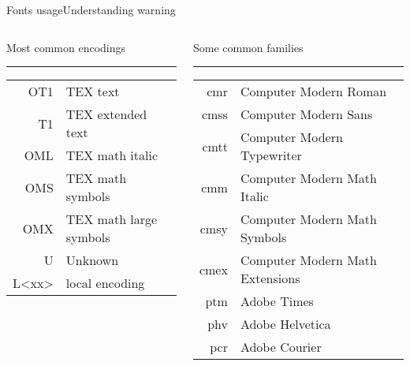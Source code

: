 \begin{frame}[fragile]{Fonts usage\magicPage}{Understanding warning}\relax

\begin{columns}[t]
\begin{column}{0.5\textwidth}

Most common encodings\strut\hrule

\begin{tabular}{rl}
     OT1 & TEX text\\
     T1 & TEX extended text\\
     OML & TEX math italic\\
     OMS & TEX math symbols\\ 
     OMX & TEX math large symbols\\
     U & Unknown\\ 
     L<xx>& local encoding
\end{tabular}
\end{column}

\begin{column}{0.5\textwidth}

Some common families\strut\hrule

\begin{tabular}{r>{\footnotesize}l}

     cmr & Computer Modern Roman\\ 
     cmss & Computer Modern Sans\\ 
     cmtt & Computer Modern Typewriter\\ 
     cmm & Computer Modern Math Italic\\ 
     cmsy & Computer Modern Math Symbols\\ 
     cmex &  Computer Modern Math Extensions\\ 
     ptm & Adobe Times\\ 
     phv & Adobe Helvetica\\ 
     pcr &Adobe Courier
\end{tabular}
\end{column}
     
\end{columns}
\cprotect{}
\end{frame}

